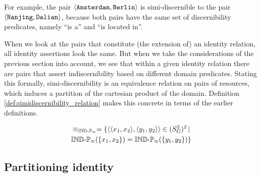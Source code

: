 For example, the pair {\small $\langle\texttt{Amsterdam},\texttt{Berlin}\rangle$}
  is simi-discernible to the pair
  {\small $\langle\texttt{Nanjing},\texttt{Dalian}\rangle$},
  because both pairs have the same set of discernibility predicates,
  namely ``is a'' and ``is located in''.

When we look at the pairs that constitute (the extension of)
  an identity relation, all identity assertions look the same.
But when we take the considerations of the previous section into account,
  we see that within a given identity relation
  there are pairs that assert indiscernibility
  based on different domain predicates.
Stating this formally,
  simi-discernibility is an equivalence relation on pairs of resources,
  which induces a partition of the cartesian product of the domain.
Definition \ref{def:simidiscernibility_relation} makes this concrete
  in terms of the earlier definitions.

\begin{definition}
\label{def:simidiscernibility_relation}
\begin{align}
  \equiv_{\operatorname{{\mathbb{IND}-\mathbb{P}}}_{\approx}}
=
  \{
    \langle\langle x_1,x_2\rangle,\langle y_1,y_2\rangle\rangle \in (S_G^2)^2
  \,\vert\,\nonumber\\
    \operatorname{{\mathbb{IND}-\mathbb{P}}}_{\approx}(\{x_1,x_2\}) = \operatorname{{\mathbb{IND}-\mathbb{P}}}_{\approx}(\{y_1,y_2\})
  \}\nonumber
\end{align}
\end{definition}



\subsection{Partitioning identity}


